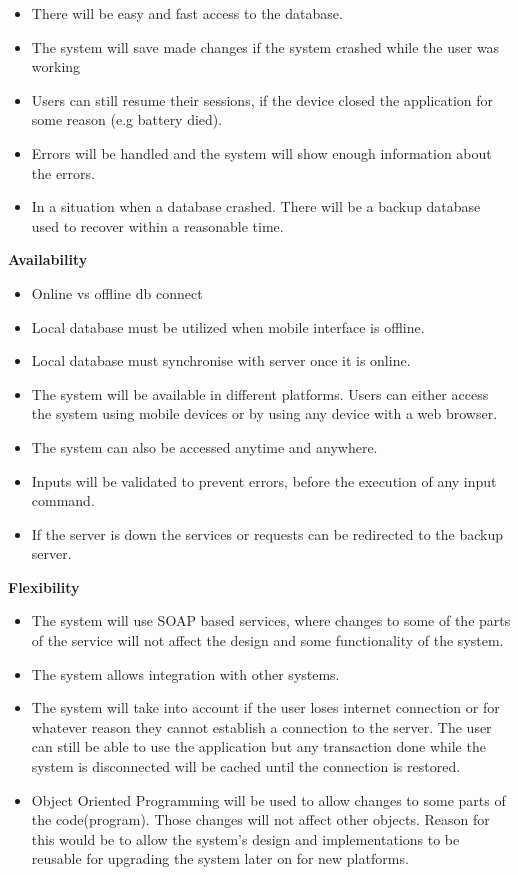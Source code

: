 \documentclass[10pt,a4paper]{article}
\begin{document}
	\begin{itemize}
		\item There will be easy and fast access to the database.
		\item The system will save made changes if the system crashed while the user was working
		\item Users can still resume their sessions, if the device closed the application for some reason (e.g battery died).
		\item Errors will be handled and the system will show enough information about the errors.
		\item In a situation when a database crashed. There will be a backup database used to recover within a reasonable time.
	\end{itemize}
	\pagebreak
\indent\indent\textbf{Availability}       
        \begin{itemize}
                \item Online vs offline db connect
                \item Local database must be utilized when mobile interface is offline.
                \item Local database must synchronise with server once it is online.
                
		\item The system will be available in different platforms. Users can either access the system using mobile devices or by using any device with a web browser.
		\item The system can also be accessed anytime and anywhere.
		\item Inputs will be validated to prevent errors, before the execution of any input command.
		\item If the server is down the services or requests can be redirected to the backup server.
	 
        \end{itemize}   
                                                      
\indent\textbf{Flexibility}         
        \begin{itemize}
                \item The system will use SOAP based services, where changes to some of the parts of the service will not affect the design and some functionality of the system.
		\item The system allows integration with other systems.
		\item The system will take into account if the user loses internet connection or for whatever reason they cannot establish a connection to the server. The user can still be able to use the application but any transaction done while the system is disconnected will be cached until the connection is restored.
		\item Object Oriented Programming will be used to allow changes to some parts of the code(program). Those changes will not affect other objects. Reason for this would be to allow the system's design and implementations to be reusable for upgrading the system later on for new platforms.
        \end{itemize}   
\end{document}
